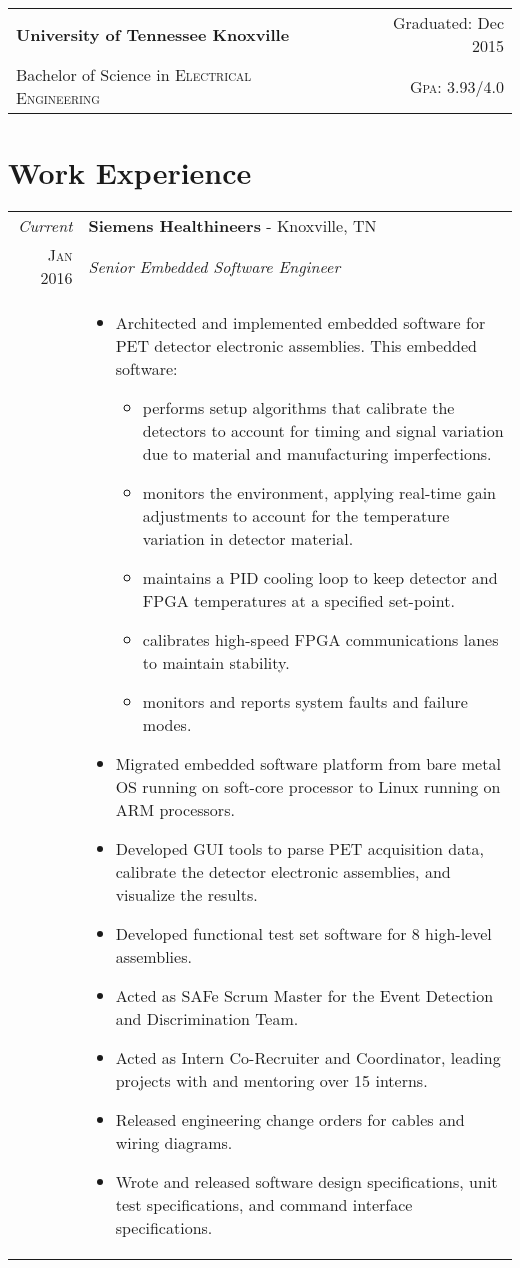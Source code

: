 \documentclass[a4paper,11pt]{article}
\begin{document}
\begin{tabularx}{\textwidth}{lXr}
   \textbf{University of Tennessee Knoxville} &  & Graduated: Dec 2015\\
   Bachelor of Science in \textsc{Electrical Engineering} &  & \normalsize \textsc{Gpa}: 3.93/4.0\\
\end{tabularx}

\hfill
\section{Work Experience}
\begin{tabularx}{\textwidth}{R|X}
   \emph{Current} & \textbf{Siemens Healthineers} \-- Knoxville, TN\\
   \textsc{Jan 2016} & \emph{Senior Embedded Software Engineer}\\
   & \small{
      \begin{itemize}[leftmargin=20pt,topsep=1pt,itemsep=1pt,partopsep=0pt, parsep=1pt]
         \item Architected and implemented embedded software for PET detector electronic assemblies. This embedded software:
         \begin{itemize}
         	\item performs setup algorithms that calibrate the detectors to account for timing and signal variation due to material and manufacturing imperfections.
		\item monitors the environment, applying real-time gain adjustments to account for the temperature variation in detector material.
		\item maintains a PID cooling loop to keep detector and FPGA temperatures at a specified set-point.
		\item calibrates high-speed FPGA communications lanes to maintain stability.
		\item monitors and reports system faults and failure modes.
         \end{itemize}
         \item Migrated embedded software platform from bare metal OS running on soft-core processor to Linux running on ARM processors.
         \item Developed GUI tools to parse PET acquisition data, calibrate the detector electronic assemblies, and visualize the results.
         \item Developed functional test set software for 8 high-level assemblies.
         \item Acted as SAFe Scrum Master for the Event Detection and Discrimination Team.
         \item Acted as Intern Co-Recruiter and Coordinator, leading projects with and mentoring over 15 interns.
         \item Released engineering change orders for cables and wiring diagrams.
         \item Wrote and released software design specifications, unit test specifications, and command interface specifications.
         

\end{itemize}}
\end{tabularx}
\end{document}
